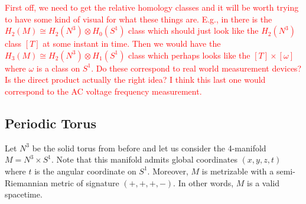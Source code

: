 \documentclass{article}
\begin{document}
\textcolor{red}{First off, we need to get the relative homology classes and it will be worth trying to have some kind of visual for what these things are. E.g., in there is the $H_2(M)\cong H_2(N^3)\otimes H_0(S^1)$ class which should just look like the $H_2(N^3)$ class $[T]$ at some instant in time. Then we would have the $H_3(M)\cong H_2(N^3)\otimes H_1(S^1)$ class which perhaps looks like the $[T]\times [\omega]$ where $\omega$ is a class on $S^1$. Do these correspond to real world measurement devices? Is the direct product actually the right idea? I think this last one would correspond to the AC voltage frequency measurement.}


\subsection{Periodic Torus}


Let $N^3$ be the solid torus from before and let us consider the 4-manifold $M=N^3 \times S^1$. Note that this manifold admits global coordinates $(x,y,z,t)$ where $t$ is the angular coordinate on $S^1$. Moreover, $M$ is metrizable with a semi-Riemannian metric of signature $(+,+,+,-)$. In other words, $M$ is a valid spacetime. 
\end{document}
